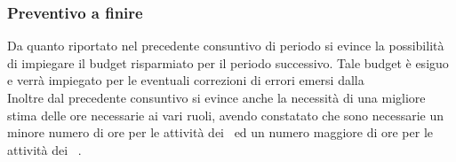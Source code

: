 \documentclass[../PianoDiProgetto.tex]{subfiles}
\begin{document}
	
	\subsubsection{Preventivo a finire}
	Da quanto riportato nel precedente consuntivo di periodo si evince la possibilità di impiegare il budget risparmiato per il periodo successivo. Tale budget è esiguo e verrà impiegato per le eventuali correzioni di errori emersi dalla \revisionediqualifica\. \\
	Inoltre dal precedente consuntivo si evince anche la necessità di una migliore stima delle ore necessarie ai vari ruoli, avendo constatato che sono necessarie un minore numero di ore per le attività dei \progettisti\ ed un numero maggiore di ore per le attività dei \programmatori\ .
		
\end{document}
